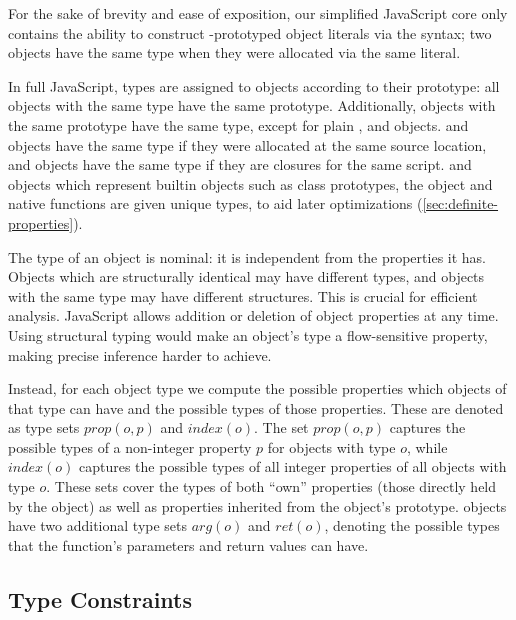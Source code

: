 For the sake of brevity and ease of exposition, our simplified JavaScript core
only contains the ability to construct -prototyped object
literals via the \code{\{\}} syntax;
two objects have the same type when they were allocated via the same literal.

In full JavaScript, types are assigned to objects according to their prototype:
all objects with the same type have the same prototype.
Additionally, objects with the same prototype have the same type,
except for plain ,  and  objects.
 and  objects have the same type if they were
allocated at the same source location,
and  objects have the same type if they are closures
for the same script.
 and  objects which represent builtin objects
such as class prototypes, the  object and native functions
are given unique types, to aid later optimizations
(\Section\ref{sec:definite-properties}).

The type of an object is nominal: it is independent from the properties it
has. Objects which are structurally identical may have different types, and
objects with the same type may have different structures. This is crucial for
efficient analysis. JavaScript allows addition or deletion of object properties
at any time. Using structural typing would make an object's type a
flow-sensitive property, making precise inference harder to achieve.

Instead, for each object type we compute the possible properties which
objects of that type can have and the possible types of those properties.
These are denoted as type sets $\mathit{prop}(o,p)$ and
$\mathit{index}(o)$. The set $\mathit{prop}(o,p)$ captures the possible types
of a non-integer property $p$ for objects with type $o$, while
$\mathit{index}(o)$ captures the possible types of all integer properties of
all objects with type $o$.
These sets cover the types of both ``own'' properties (those directly held
by the object) as well as properties inherited from the object's prototype.
 objects have two additional type sets
$\mathit{arg}(o)$ and $\mathit{ret}(o)$, denoting
the possible types that the function's parameters and return values can have.

\subsection{Type Constraints}
\label{sec:constraints}

